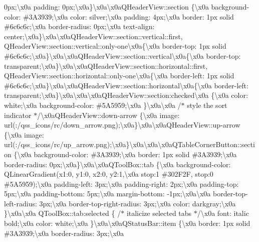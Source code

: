 0px;\textbackslash{}x0a padding\+: 0px;\textbackslash{}x0a\}\textbackslash{}x0a\textbackslash{}x0a\+Q\+Header\+View\+::section \{\textbackslash{}x0a background-\/color\+: \#3\+A3939;\textbackslash{}x0a color\+: silver;\textbackslash{}x0a padding\+: 4px;\textbackslash{}x0a border\+: 1px solid \#6c6c6c;\textbackslash{}x0a border-\/radius\+: 0px;\textbackslash{}x0a text-\/align\+: center;\textbackslash{}x0a\}\textbackslash{}x0a\textbackslash{}x0a\+Q\+Header\+View\+::section\+::vertical\+::first, Q\+Header\+View\+::section\+::vertical\+::only-\/one\textbackslash{}x0a\{\textbackslash{}x0a border-\/top\+: 1px solid \#6c6c6c;\textbackslash{}x0a\}\textbackslash{}x0a\textbackslash{}x0a\+Q\+Header\+View\+::section\+::vertical\textbackslash{}x0a\{\textbackslash{}x0a border-\/top\+: transparent;\textbackslash{}x0a\}\textbackslash{}x0a\textbackslash{}x0a\+Q\+Header\+View\+::section\+::horizontal\+::first, Q\+Header\+View\+::section\+::horizontal\+::only-\/one\textbackslash{}x0a\{\textbackslash{}x0a border-\/left\+: 1px solid \#6c6c6c;\textbackslash{}x0a\}\textbackslash{}x0a\textbackslash{}x0a\+Q\+Header\+View\+::section\+::horizontal\textbackslash{}x0a\{\textbackslash{}x0a border-\/left\+: transparent;\textbackslash{}x0a\}\textbackslash{}x0a\textbackslash{}x0a\textbackslash{}x0a\+Q\+Header\+View\+::section\+:checked\textbackslash{}x0a \{\textbackslash{}x0a color\+: white;\textbackslash{}x0a background-\/color\+: \#5\+A5959;\textbackslash{}x0a \}\textbackslash{}x0a\textbackslash{}x0a /$\ast$ style the sort indicator $\ast$/\textbackslash{}x0a\+Q\+Header\+View\+::down-\/arrow \{\textbackslash{}x0a image\+: url(\+:/qss\+\_\+icons/rc/down\+\_\+arrow.\+png);\textbackslash{}x0a\}\textbackslash{}x0a\textbackslash{}x0a\+Q\+Header\+View\+::up-\/arrow \{\textbackslash{}x0a image\+: url(\+:/qss\+\_\+icons/rc/up\+\_\+arrow.\+png);\textbackslash{}x0a\}\textbackslash{}x0a\textbackslash{}x0a\textbackslash{}x0a\+Q\+Table\+Corner\+Button\+::section \{\textbackslash{}x0a background-\/color\+: \#3\+A3939;\textbackslash{}x0a border\+: 1px solid \#3\+A3939;\textbackslash{}x0a border-\/radius\+: 0px;\textbackslash{}x0a\}\textbackslash{}x0a\textbackslash{}x0a\+Q\+Tool\+Box\+::tab \{\textbackslash{}x0a background-\/color\+: Q\+Linear\+Gradient(x1\+:0, y1\+:0, x2\+:0, y2\+:1,\textbackslash{}x0a stop\+:1 \#302\+F2\+F, stop\+:0 \#5\+A5959);\textbackslash{}x0a padding-\/left\+: 3px;\textbackslash{}x0a padding-\/right\+: 2px;\textbackslash{}x0a padding-\/top\+: 5px;\textbackslash{}x0a padding-\/bottom\+: 5px;\textbackslash{}x0a margin-\/bottom\+: -\/1px;\textbackslash{}x0a\textbackslash{}x0a border-\/top-\/left-\/radius\+: 3px;\textbackslash{}x0a border-\/top-\/right-\/radius\+: 3px;\textbackslash{}x0a color\+: darkgray;\textbackslash{}x0a \}\textbackslash{}x0a\textbackslash{}x0a Q\+Tool\+Box\+::tab\+:selected \{ /$\ast$ italicize selected tabs $\ast$/\textbackslash{}x0a font\+: italic bold;\textbackslash{}x0a color\+: white;\textbackslash{}x0a \}\textbackslash{}x0a\textbackslash{}x0a\+Q\+Status\+Bar\+::item \{\textbackslash{}x0a border\+: 1px solid \#3\+A3939;\textbackslash{}x0a border-\/radius\+: 3px;\textbackslash{}x0a 